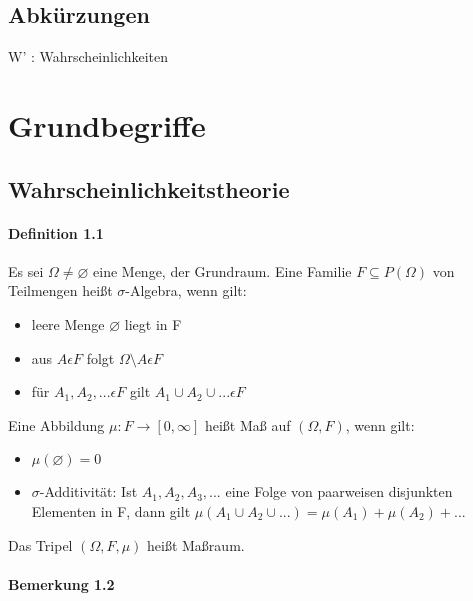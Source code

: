 \documentclass[paper=a4, fontsize=11pt]{scrartcl}
\numberwithin{equation}{section}
\numberwithin{figure}{section}
\numberwithin{table}{section}
\begin{document}
\subsection{Abkürzungen}

W' : Wahrscheinlichkeiten


\section{Grundbegriffe}

\subsection{Wahrscheinlichkeitstheorie}

\paragraph{Definition 1.1}

Es sei $ \Omega \neq \varnothing$ eine Menge, der Grundraum. Eine Familie $F \subseteq P( \Omega)$ von Teilmengen heißt $ \sigma$-Algebra, wenn gilt:

\begin{itemize}
\item leere Menge $ \varnothing$ liegt in F
\item aus $A \epsilon F$ folgt $ \Omega \setminus A \epsilon F$
\item für $A_{1}, A_{2}, ... \epsilon F$ gilt $A_{1} \cup A_{2} \cup ... \epsilon F$
\end{itemize}

Eine Abbildung $\mu : F \rightarrow [0, \infty ]$ heißt Maß auf $(\Omega, F)$, wenn gilt:

\begin{itemize}
\item $\mu (\varnothing) = 0$
\item $\sigma$-Additivität: Ist $A_{1}, A_{2},A_{3},... $ eine Folge von paarweisen disjunkten Elementen in F, dann gilt $\mu (A_{1} \cup A_{2} \cup ...) = \mu  (A_{1}) + \mu (A_{2}) + ...$ 
\end{itemize}

Das Tripel $( \Omega, F, \mu)$ heißt Maßraum.

\paragraph{Bemerkung 1.2}
\end{document}
